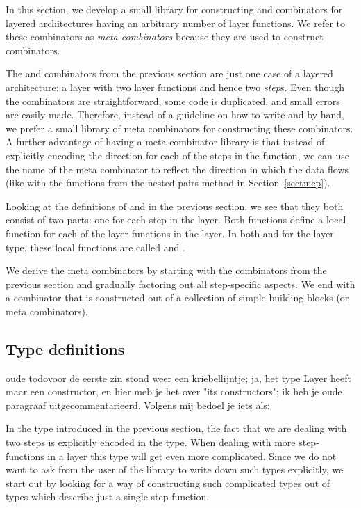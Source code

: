 \documentclass[preprint,natbib]{sigplanconf}
\begin{document}
In this section, we develop a small library for constructing  and  combinators for layered architectures having an arbitrary number of layer functions. We refer to these combinators as {\em meta combinators} because they are used to construct combinators.

The  and  combinators from the previous section are just one case of a layered architecture: a layer with two layer functions and hence two {\em step}s. Even though the combinators are straightforward, some code is duplicated, and small errors are easily made. Therefore, instead of a guideline on how to write  and  by hand, we prefer a small library of meta combinators for constructing these combinators. A further  advantage of having  a meta-combinator library is that instead of explicitly encoding the direction for each of the steps in the  function, we can use the name of the meta combinator to reflect the direction in which the data flows (like with the  functions from the nested pairs method in Section~\ref{sect:ncp}).

Looking at the definitions of  and  in the previous section, we see that they both consist of two parts: one for each step in the layer. Both functions define a local function for each of the layer functions in the layer. In both  and  for the  layer type, these local functions are called  and . 

We derive the meta combinators by starting with the combinators from the previous section and gradually factoring out all step-specific aspects. We end with a combinator that is constructed out of a collection of simple building blocks (or meta combinators). 



 
%																
\subsection{Type definitions} \label{subsecttypedef}

\bc
oude todo{voor de eerste zin stond weer een kriebellijntje; ja, het type Layer heeft maar een constructor, en hier meb je het over "its constructors"; ik heb je oude paragraaf uitgecommentarieerd. Volgens mij bedoel je iets als:}



In the  type introduced in the previous section, the fact that we are dealing with two steps is explicitly encoded in the type. When dealing with more step-functions in a layer this type will get even more complicated. Since we do not want to ask from the user of the library to write  down such types explicitly, we start out by looking for a way of constructing such complicated types out of types which describe just a single step-function.
\ec
\end{document}

